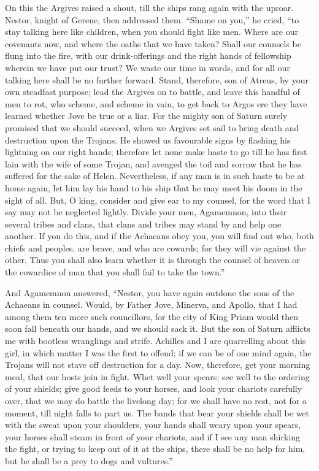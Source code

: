On this the Argives raised a shout, till the ships rang again with the
uproar. Nestor, knight of Gerene, then addressed them. “Shame on you,” he
cried, “to stay talking here like children, when you should fight like
men. Where are our covenants now, and where the oaths that we have taken?
Shall our counsels be flung into the fire, with our drink-offerings and
the right hands of fellowship wherein we have put our trust? We waste our
time in words, and for all our talking here shall be no further forward.
Stand, therefore, son of Atreus, by your own steadfast purpose; lead the
Argives on to battle, and leave this handful of men to rot, who scheme,
and scheme in vain, to get back to Argos ere they have learned whether
Jove be true or a liar. For the mighty son of Saturn surely promised that
we should succeed, when we Argives set sail to bring death and destruction
upon the Trojans. He showed us favourable signs by flashing his lightning
on our right hands; therefore let none make haste to go till he has first
lain with the wife of some Trojan, and avenged the toil and sorrow that he
has suffered for the sake of Helen. Nevertheless, if any man is in such
haste to be at home again, let him lay his hand to his ship that he may
meet his doom in the sight of all. But, O king, consider and give ear to
my counsel, for the word that I say may not be neglected lightly. Divide
your men, Agamemnon, into their several tribes and clans, that clans and
tribes may stand by and help one another. If you do this, and if the
Achaeans obey you, you will find out who, both chiefs and peoples, are
brave, and who are cowards; for they will vie against the other. Thus you
shall also learn whether it is through the counsel of heaven or the
cowardice of man that you shall fail to take the town.”

And Agamemnon answered, “Nestor, you have again outdone the sons of the
Achaeans in counsel. Would, by Father Jove, Minerva, and Apollo, that I
had among them ten more such councillors, for the city of King Priam would
then soon fall beneath our hands, and we should sack it. But the son of
Saturn afflicts me with bootless wranglings and strife. Achilles and I are
quarrelling about this girl, in which matter I was the first to offend; if
we can be of one mind again, the Trojans will not stave off destruction
for a day. Now, therefore, get your morning meal, that our hosts join in
fight. Whet well your spears; see well to the ordering of your shields;
give good feeds to your horses, and look your chariots carefully over,
that we may do battle the livelong day; for we shall have no rest, not for
a moment, till night falls to part us. The bands that bear your shields
shall be wet with the sweat upon your shoulders, your hands shall weary
upon your spears, your horses shall steam in front of your chariots, and
if I see any man shirking the fight, or trying to keep out of it at the
ships, there shall be no help for him, but he shall be a prey to dogs and
vultures.”

